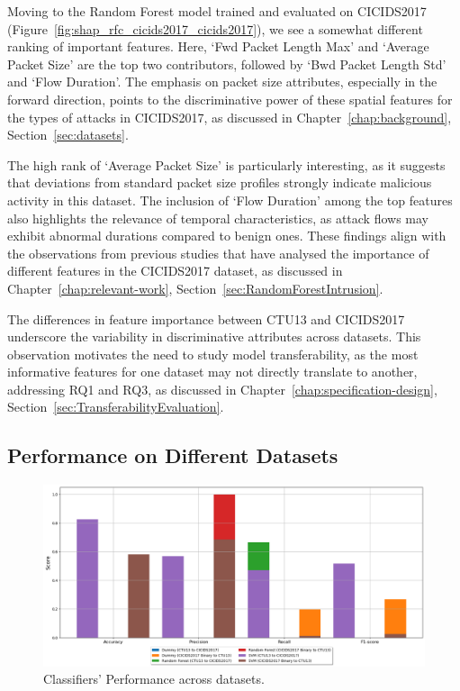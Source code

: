 Moving to the Random Forest model trained and evaluated on CICIDS2017 (Figure~\ref{fig:shap_rfc_cicids2017_cicids2017}), we see a somewhat different ranking of important features. Here, `Fwd Packet Length Max' and `Average Packet Size' are the top two contributors, followed by `Bwd Packet Length Std' and `Flow Duration'. The emphasis on packet size attributes, especially in the forward direction, points to the discriminative power of these spatial features for the types of attacks in CICIDS2017, as discussed in Chapter~\ref{chap:background}, Section~\ref{sec:datasets}.

The high rank of `Average Packet Size' is particularly interesting, as it suggests that deviations from standard packet size profiles strongly indicate malicious activity in this dataset. The inclusion of `Flow Duration' among the top features also highlights the relevance of temporal characteristics, as attack flows may exhibit abnormal durations compared to benign ones. These findings align with the observations from previous studies that have analysed the importance of different features in the CICIDS2017 dataset, as discussed in Chapter~\ref{chap:relevant-work}, Section~\ref{sec:RandomForestIntrusion}.

The differences in feature importance between CTU13 and CICIDS2017 underscore the variability in discriminative attributes across datasets. This observation motivates the need to study model transferability, as the most informative features for one dataset may not directly translate to another, addressing RQ1 and RQ3, as discussed in Chapter~\ref{chap:specification-design}, Section~\ref{sec:TransferabilityEvaluation}.

\subsection{Performance on Different Datasets}\label{subsec:performance-different-dataset}

\begin{figure}[H]
    \centering
    \includegraphics[width=1\textwidth]{img/Classifier_Performance _Across_Datasets.png}
    \caption{Classifiers' Performance across datasets.}\label{fig:classifier_performance_across_dataset}
\end{figure}

